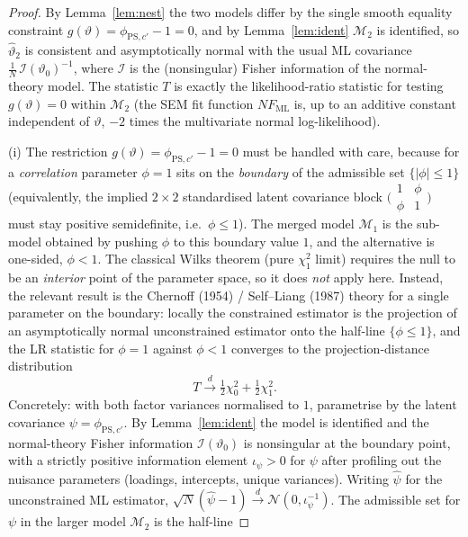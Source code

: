 \documentclass{amsart}
\theoremstyle{remark}
\begin{document}
\begin{proof}
By Lemma~\ref{lem:nest} the two models differ by the single smooth equality
constraint $g(\vartheta)=\phi_{\mathrm{PS},c'}-1=0$, and by Lemma~\ref{lem:ident}
$\mathcal M_2$ is identified, so $\hat\vartheta_2$ is consistent and asymptotically
normal with the usual ML covariance $\frac1N\,\mathcal I(\vartheta_0)^{-1}$, where
$\mathcal I$ is the (nonsingular) Fisher information of the normal-theory model.
The statistic $T$ is exactly the likelihood-ratio statistic for testing
$g(\vartheta)=0$ within $\mathcal M_2$ (the SEM fit function $NF_{\mathrm{ML}}$ is,
up to an additive constant independent of $\vartheta$, $-2$ times the multivariate
normal log-likelihood). 

(i) The restriction $g(\vartheta)=\phi_{\mathrm{PS},c'}-1=0$ must be handled with
care, because for a \emph{correlation} parameter $\phi=1$ sits on the
\emph{boundary} of the admissible set $\{|\phi|\le1\}$ (equivalently, the implied
$2\times2$ standardised latent covariance block
$\bigl(\begin{smallmatrix}1&\phi\\ \phi&1\end{smallmatrix}\bigr)$ must stay
positive semidefinite, i.e.\ $\phi\le1$). The merged model $\mathcal M_1$ is the
sub-model obtained by pushing $\phi$ to this boundary value $1$, and the
alternative is one-sided, $\phi<1$. The classical Wilks theorem (pure $\chi^2_1$
limit) requires the null to be an \emph{interior} point of the parameter space, so
it does \emph{not} apply here. Instead, the relevant result is the
Chernoff (1954) / Self--Liang (1987) theory for a single parameter on the boundary:
locally the constrained estimator is the projection of an asymptotically normal
unconstrained estimator onto the half-line $\{\phi\le1\}$, and the LR statistic for
$\phi=1$ against $\phi<1$ converges to the projection-distance distribution
\[
T\xrightarrow{d}\tfrac12\chi^2_0+\tfrac12\chi^2_1 .
\]
Concretely: with both factor variances normalised to $1$, parametrise by the latent
covariance $\psi=\phi_{\mathrm{PS},c'}$. By Lemma~\ref{lem:ident} the model is
identified and the normal-theory Fisher information $\mathcal I(\vartheta_0)$ is
nonsingular at the boundary point, with a strictly positive information element
$\iota_{\psi}>0$ for $\psi$ after profiling out the nuisance parameters
(loadings, intercepts, unique variances). Writing $\hat\psi$ for the unconstrained
ML estimator, $\sqrt N(\hat\psi-1)\xrightarrow{d}\mathcal N(0,\iota_\psi^{-1})$.
The admissible set for $\psi$ in the larger model $\mathcal M_2$ is the half-line

\end{proof}
\end{document}
